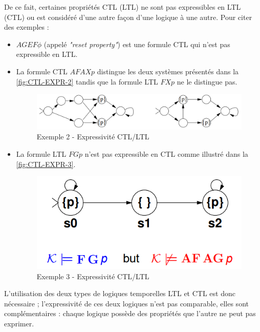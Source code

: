 \documentclass[runningheads,a4paper,10pt]{llncs}
\begin{document}
De ce fait, certaines propriétés CTL (LTL) ne sont pas expressibles en LTL (CTL) ou est considéré d'une autre façon d'une logique à une autre. Pour citer des exemples : 

\begin{itemize}
 \renewcommand{\labelitemi}{\scriptsize$\bullet$}
 \item  $AGEF\phi$ (appelé \textit{"reset property"}) est une formule CTL qui n'est pas expressible en LTL.
 \item La formule CTL $AFAXp$ distingue les deux systèmes présentés dans la \autoref{fig:CTL-EXPR-2} tandis que la formule LTL $FXp$ ne le distingue pas. 
 
 \begin{figure}
  \centering
   \includegraphics[scale=0.43]{figures/CTL-EXPR-2.png}
   \caption[Caption for LOF]{Exemple 2 - Expressivité CTL/LTL}
   \label{fig:CTL-EXPR-2}
\end{figure}

\item La formule LTL $FGp$ n'est pas expressible en CTL comme illustré dans la \autoref{fig:CTL-EXPR-3}. \\

 \begin{figure}
  \centering
   \includegraphics[scale=0.43]{figures/CTL-EXPR-3.png}
   \caption[Caption for LOF]{Exemple 3 - Expressivité CTL/LTL}
   \label{fig:CTL-EXPR-3}
\end{figure}

\end{itemize}

L'utilisation des deux types de logiques temporelles LTL et CTL est donc nécessaire ; l'expressivité de ces deux logiques n'est pas comparable, elles sont complémentaires : chaque logique possède des propriétés que l'autre ne peut pas exprimer. 
\end{document}
